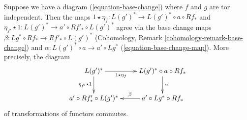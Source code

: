 \begin{lemma}
\label{lemma-unit-and-base-change}
Suppose we have a diagram (\ref{equation-base-change}) where $f$ and $g$
are tor independent. Then the maps
$1 \star \eta_f : L(g')^* \to L(g')^* \circ a \circ Rf_*$ and
$\eta_{f'} \star 1 : L(g')^* \to a' \circ Rf'_* \circ L(g')^*$
agree via the base change maps
$\beta : Lg^* \circ Rf_* \to Rf'_* \circ L(g')^*$
(Cohomology, Remark \ref{cohomology-remark-base-change})
and $\alpha : L(g')^* \circ a \to a' \circ Lg^*$
(\ref{equation-base-change-map}).
More precisely, the diagram
$$
\xymatrix{
L(g')^* \ar[r]_-{1 \star \eta_f} \ar[d]_{\eta_{f'} \star 1} &
L(g')^* \circ a \circ Rf_* \ar[d]^\alpha \\
a' \circ Rf'_* \circ L(g')^* &
a' \circ Lg^* \circ Rf_* \ar[l]_-\beta
}
$$
of transformations of functors commutes.
\end{lemma}

